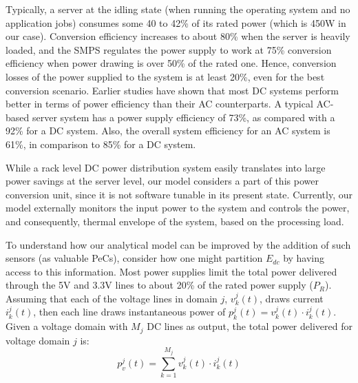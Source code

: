 Typically, a server at the idling state (when running the operating
system and no application jobs) consumes some 40 to 42\% of its rated
power (which is 450W in our case).  Conversion efficiency increases to
about 80\% when the server is heavily loaded, and the SMPS regulates the
power supply to work at 75\% conversion efficiency when power drawing is
over 50\% of the rated one.  Hence, conversion losses of the power
supplied to the system is at least 20\%, even for the best conversion
scenario.  Earlier studies \cite{ton2008} have shown that most DC
systems perform better in terms of power efficiency than their AC
counterparts.  A typical AC-based server system has a power supply
efficiency of 73\%, as compared with a 92\% for a DC system.  Also, the
overall system efficiency for an AC system is 61\%, in comparison to
85\% for a DC system.

While a rack level DC power distribution system easily translates into
large power savings at the server level, our model considers a part of
this power conversion unit, since it is not software tunable in its
present state. Currently, our model externally monitors the input power
to the system and controls the power, and consequently, thermal envelope
of the system, based on the processing load.

To understand how our analytical model can be improved by the addition
of such sensors (as valuable PeCs), consider how one might partition
$E_{dc}$ by having access to this information.  Most power supplies
limit the total power delivered through the 5V and 3.3V lines to about
20\% of the rated power supply ($P_R$).  Assuming that each of the
voltage lines in domain $j$, $v_{k}^{j}(t)$, draws current
$i_{k}^{j}(t)$, then each line draws instantaneous power of
$p_{k}^{j}(t) = v_{k}^{j}(t)\cdot i_{k}^{j}(t)$.  Given a voltage domain
with $M_{j}$ DC lines as output, the total power delivered for voltage
domain $j$ is:
\begin{equation*}
\label{eq:power_vdomain}
p_{v}^{j}(t)=  \sum_{k=1}^{M_{j}} v_{k}^{j}(t)\cdot i_{k}^{j}(t)
\end{equation*}

